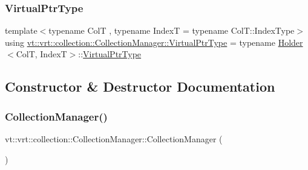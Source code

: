 \mbox{\label{structvt_1_1vrt_1_1collection_1_1_collection_manager_a1da9015e52d6ecca955f57b59aab0b82}} 
\subsubsection{\texorpdfstring{Virtual\+Ptr\+Type}{VirtualPtrType}}
{\footnotesize\ttfamily template$<$typename ColT , typename IndexT  = typename Col\+T\+::\+Index\+Type$>$ \\
using \hyperlink{structvt_1_1vrt_1_1collection_1_1_collection_manager_a1da9015e52d6ecca955f57b59aab0b82}{vt\+::vrt\+::collection\+::\+Collection\+Manager\+::\+Virtual\+Ptr\+Type} =  typename \hyperlink{structvt_1_1vrt_1_1collection_1_1_holder}{Holder}$<$ColT, IndexT$>$\+::\hyperlink{structvt_1_1vrt_1_1collection_1_1_collection_manager_a1da9015e52d6ecca955f57b59aab0b82}{Virtual\+Ptr\+Type}}



\subsection{Constructor \& Destructor Documentation}
\mbox{\label{structvt_1_1vrt_1_1collection_1_1_collection_manager_ad6c6c75f1f54ae5470847311256ae8c3}} 
\subsubsection{\texorpdfstring{Collection\+Manager()}{CollectionManager()}}
{\footnotesize\ttfamily vt\+::vrt\+::collection\+::\+Collection\+Manager\+::\+Collection\+Manager (\begin{DoxyParamCaption}{ }\end{DoxyParamCaption})}



